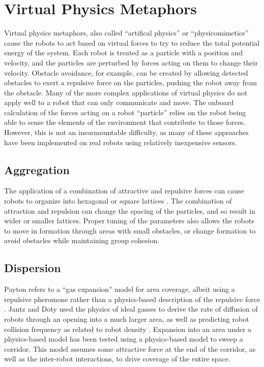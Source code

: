 \documentclass[]{article}
\begin{document}
\section{Virtual Physics Metaphors}

Virtual physics metaphors, also called ``artifical physics'' or ``physicomimetics'' cause the robots to act based on virtual forces to try to reduce the total potential energy of the system. 
Each robot is treated as a particle with a position and velocity, and the particles are perturbed by forces acting on them to change their velocity. 
Obstacle avoidance, for example, can be created by allowing detected obstacles to exert a repulsive force on the particles, pushing the robot away from the obstacle. 
Many of the more complex applications of virtual physics do not apply well to a robot that can only communicate and move.
The onboard calculation of the forces acting on a robot ``particle'' relies on the robot being able to sense the elements of the environment that contribute to those forces. 
However, this is not an insurmountable difficulty, as many of these approaches have been implemented on real robots using relatively inexpensive sensors. 

\subsection{Aggregation}

The application of a combination of attractive and repulsive forces can cause robots to organize into hexagonal or square lattices \cite{spears2004overview}.
The combination of attraction and repulsion can change the spacing of the particles, and so result in wider or smaller lattices. 
Proper tuning of the parameters also allows the robots to move in formation through areas with small obstacles, or change formation to avoid obstacles while maintaining group cohesion. 
 
\subsection{Dispersion}

Payton refers to a ``gas expansion'' model for area coverage, albeit using a repulsive pheromone rather than a physics-based description of the repulsive force \cite{payton2001pheromone}. 
Jantz and Doty used the physics of ideal gasses to derive the rate of diffusion of robots through an opening into a much larger area, as well as predicting robot collision frequency as related to robot density \cite{jantz1997kinetics}. 
Expansion into an area under a physics-based model has been tested using a physics-based model to sweep a corridor\cite{spears2006physics}.
This model assumes some attractive force at the end of the corridor, as well as the inter-robot interactions, to drive coverage of the entire space. 
\end{document}
